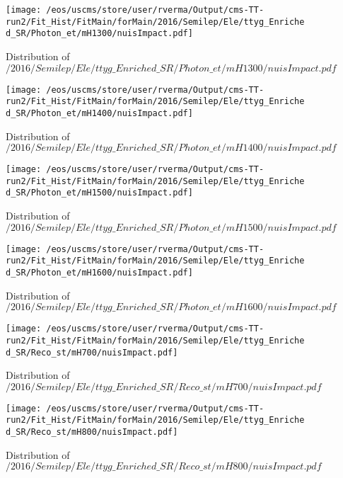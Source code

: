 \begin{figure}
\centering
\texttt{[image: /eos/uscms/store/user/rverma/Output/cms-TT-run2/Fit\_Hist/FitMain/forMain/2016/Semilep/Ele/ttyg\_Enriched\_SR/Photon\_et/mH1300/nuisImpact.pdf]}
\caption{Distribution of $/2016/Semilep/Ele/ttyg\_Enriched\_SR/Photon\_et/mH1300/nuisImpact.pdf$}
\end{figure}

\begin{figure}
\centering
\texttt{[image: /eos/uscms/store/user/rverma/Output/cms-TT-run2/Fit\_Hist/FitMain/forMain/2016/Semilep/Ele/ttyg\_Enriched\_SR/Photon\_et/mH1400/nuisImpact.pdf]}
\caption{Distribution of $/2016/Semilep/Ele/ttyg\_Enriched\_SR/Photon\_et/mH1400/nuisImpact.pdf$}
\end{figure}

\begin{figure}
\centering
\texttt{[image: /eos/uscms/store/user/rverma/Output/cms-TT-run2/Fit\_Hist/FitMain/forMain/2016/Semilep/Ele/ttyg\_Enriched\_SR/Photon\_et/mH1500/nuisImpact.pdf]}
\caption{Distribution of $/2016/Semilep/Ele/ttyg\_Enriched\_SR/Photon\_et/mH1500/nuisImpact.pdf$}
\end{figure}

\begin{figure}
\centering
\texttt{[image: /eos/uscms/store/user/rverma/Output/cms-TT-run2/Fit\_Hist/FitMain/forMain/2016/Semilep/Ele/ttyg\_Enriched\_SR/Photon\_et/mH1600/nuisImpact.pdf]}
\caption{Distribution of $/2016/Semilep/Ele/ttyg\_Enriched\_SR/Photon\_et/mH1600/nuisImpact.pdf$}
\end{figure}

\begin{figure}
\centering
\texttt{[image: /eos/uscms/store/user/rverma/Output/cms-TT-run2/Fit\_Hist/FitMain/forMain/2016/Semilep/Ele/ttyg\_Enriched\_SR/Reco\_st/mH700/nuisImpact.pdf]}
\caption{Distribution of $/2016/Semilep/Ele/ttyg\_Enriched\_SR/Reco\_st/mH700/nuisImpact.pdf$}
\end{figure}

\begin{figure}
\centering
\texttt{[image: /eos/uscms/store/user/rverma/Output/cms-TT-run2/Fit\_Hist/FitMain/forMain/2016/Semilep/Ele/ttyg\_Enriched\_SR/Reco\_st/mH800/nuisImpact.pdf]}
\caption{Distribution of $/2016/Semilep/Ele/ttyg\_Enriched\_SR/Reco\_st/mH800/nuisImpact.pdf$}
\end{figure}


